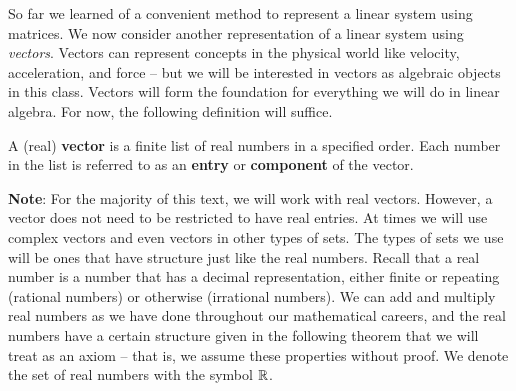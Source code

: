 \label{sec:vec_rep_intro}

So far we learned of a convenient method to represent a linear system using matrices. We now consider another representation of a linear system using \emph{vectors}. Vectors can represent concepts in the physical world like velocity, acceleration, and force -- but we will be interested in vectors as algebraic objects in this class. Vectors will form the foundation for everything we will do in linear algebra. For now, the following definition will suffice.

\begin{definition} A (real) \textbf{vector} is a finite list of real numbers in a specified order. Each number in the list is referred to as an \textbf{entry} or \textbf{component} of the vector.
\end{definition}

\noindent \textbf{Note}: For the majority of this text, we will work with real vectors. However, a vector does not need to be restricted to have real entries. At times we will use complex vectors and even vectors in other types of sets. The types of sets we use will be ones that have structure just like the real numbers. Recall that a real number is a number that has a decimal representation, either finite or repeating (rational numbers) or otherwise (irrational numbers). We can add and multiply real numbers as we have done throughout our mathematical careers, and the real numbers have a certain structure given in the following theorem that we will treat as an axiom -- that is, we assume these properties without proof. We denote the set of real numbers with the symbol $\mathbb{R}$. 

